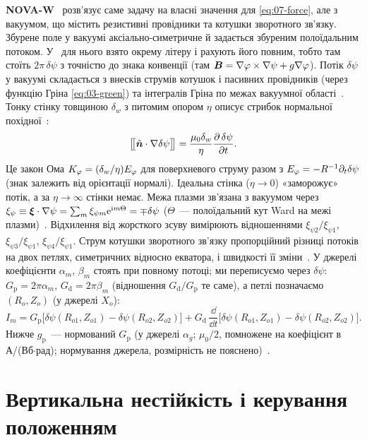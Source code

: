 \textbf{NOVA-W}~\cite[с.~7--9]{Ward1992} розв'язує саме задачу на власні значення для \eqref{eq:07-force}, але з вакуумом, що містить резистивні провідники та котушки зворотного зв'язку. Збурене поле у вакуумі аксіально-симетричне й задається збуреним полоїдальним потоком. У~\cite{Ward1992} для нього взято окрему літеру і рахують його повним, тобто там стоїть $2\pi\,\delta\psi$ з точністю до знака конвенції (там $\bm{B}=\nabla\varphi\times\nabla\psi+g\nabla\varphi$). Потік $\delta\psi$ у вакуумі складається з внесків струмів котушок і пасивних провідників (через функцію Гріна \eqref{eq:03-green}) та інтегралів Гріна по межах вакуумної області~\cite[с.~8, (7)]{Ward1992}. Тонку стінку товщиною $\delta_w$ з питомим опором $\eta$ описує стрибок нормальної похідної~\cite[с.~9, (9)]{Ward1992}:
\begin{equation}\label{eq:07-wall}
\big[\!\big[\hat{\bm{n}}\cdot\nabla\delta\psi\big]\!\big]=\frac{\mu_0\delta_w}{\eta}\frac{\partial\,\delta\psi}{\partial t}.
\end{equation}
Це закон Ома $K_\varphi=(\delta_w/\eta)E_\varphi$ для поверхневого струму разом з $E_\varphi=-R^{-1}\partial_t\delta\psi$ (знак залежить від орієнтації нормалі). Ідеальна стінка ($\eta\to0$) «заморожує» потік, а за $\eta\to\infty$ стінки немає. Межа плазми зв'язана з вакуумом через $\xi_\psi\equiv\bm{\xi}\cdot\nabla\psi=\sum_m\xi_{\psi m}\mathrm{e}^{\mathrm{i}m\Theta}=\mp\delta\psi$ ($\Theta$~--- полоїдальний кут Ward на межі плазми)~\cite[с.~9, (11)]{Ward1992}. Відхилення від жорсткого зсуву вимірюють відношеннями $\xi_{\psi2}/\xi_{\psi1}$, $\xi_{\psi3}/\xi_{\psi1}$, $\xi_{\psi4}/\xi_{\psi1}$. Струм котушки зворотного зв'язку пропорційний різниці потоків на двох петлях, симетричних відносно екватора, і швидкості її зміни~\cite[с.~8, (8)]{Ward1992}. У джерелі коефіцієнти $\alpha_m$, $\beta_m$ стоять при повному потоці; ми переписуємо через $\delta\psi$: $G_{\mathrm p}=2\pi\alpha_m$, $G_{\mathrm d}=2\pi\beta_m$ (відношення $G_{\mathrm d}/G_{\mathrm p}$ те саме), а петлі позначаємо $(R_o,Z_o)$ (у джерелі $X_o$):
\begin{equation}\label{eq:07-PD}
I_m=G_{\mathrm p}\big[\delta\psi(R_{o1},Z_{o1})-\delta\psi(R_{o2},Z_{o2})\big]+G_{\mathrm d}\,\frac{\dd}{\dd t}\big[\delta\psi(R_{o1},Z_{o1})-\delta\psi(R_{o2},Z_{o2})\big].
\end{equation} Нижче $g_{\mathrm p}$~--- нормований $G_{\mathrm p}$ (у джерелі $\alpha_g$; $\mu_0/2$, помножене на коефіцієнт в А/(Вб$\cdot$рад); нормування джерела, розмірність не пояснено)~\cite[с.~22]{Ward1992}.

\section{Вертикальна нестійкість і керування положенням}\label{sec:07-vde}

